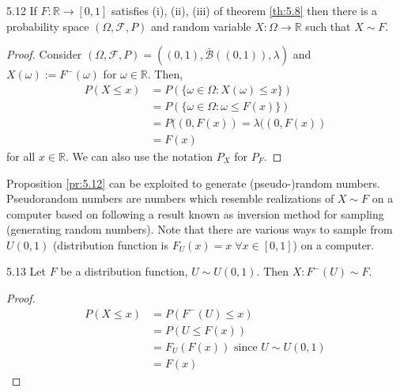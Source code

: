 \documentclass{article}
\newcommand{\R}{\mathbb{R}}
\begin{document}
	\begin{myprop}{}{5.12}
		If $F : \R\to[0, 1]$ satisfies (i), (ii), (iii) of theorem \ref{th:5.8} then there is a probability space $(\Omega, \mathcal{F}, P)$ and random variable $X : \Omega\to\R$ such that $X\sim F$.
		
		\begin{proof}
			Consider $(\Omega, \mathcal{F}, P)=((0, 1), \bar{\mathcal{B}}((0, 1)), \lambda)$ and $X(\omega):=F^-(\omega)$ for $\omega\in\R$. Then,
			\begin{align*}
				P(X\leq x)&=P(\{\omega\in\Omega : X(\omega)\leq x\})\\
				&=P(\{\omega\in\Omega : \omega\leq F(x)\})\\
				&=P((0, F(x))=\lambda((0, F(x))\\
				&=F(x)
			\end{align*}
			for all $x\in\R$. We can also use the notation $P_X$ for $P_F$.
		\end{proof}
	\end{myprop}
	
	Proposition \ref{pr:5.12} can be exploited to generate (pseudo-)random numbers. Pseudorandom numbers are numbers which resemble realizations of $X\sim F$ on a computer based on following a result known as inversion method for sampling (generating random numbers). Note that there are various ways to sample from $U(0, 1)$ (distribution function is $F_U(x)=x\;\forall x\in[0, 1]$) on a computer.
	
	\begin{myprop}{}{5.13}
		Let $F$ be a distribution function, $U\sim U(0, 1)$. Then $X : F^-(U)\sim F$.
		
		\begin{proof}
			\begin{align*}
				P(X\leq x)&=P(F^-(U)\leq x)\\
				&=P(U\leq F(x))\\
				&=F_U(F(x))\mbox{ since $U\sim U(0, 1)$}\\
				&=F(x)
			\end{align*}
		\end{proof}
	\end{myprop}
	
\end{document}
